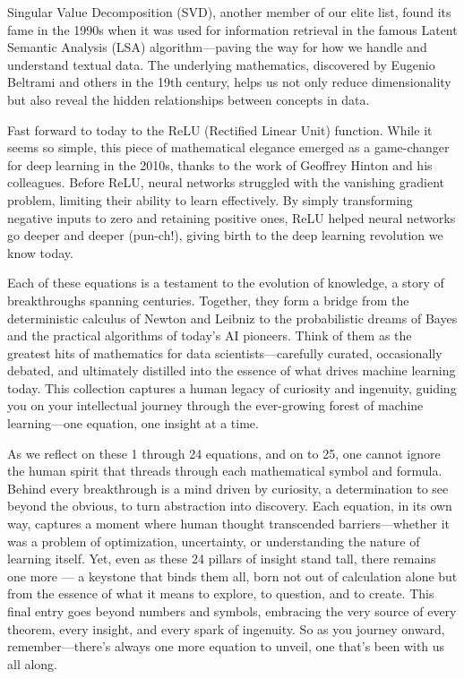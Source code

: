 \documentclass[
  12 pt,
  a4paper,
]{book}
\numberwithin{equation}{section}
\theoremstyle{plain}      %
\theoremstyle{definition} %
\theoremstyle{remark}     %
\theoremstyle{note}         %
\begin{document}
Singular Value Decomposition (SVD), another member of our elite list,
found its fame in the 1990s when it was used for information retrieval
in the famous Latent Semantic Analysis (LSA) algorithm---paving the way
for how we handle and understand textual data. The underlying
mathematics, discovered by Eugenio Beltrami and others in the 19th
century, helps us not only reduce dimensionality but also reveal the
hidden relationships between concepts in data.

Fast forward to today to the ReLU (Rectified Linear Unit) function.
While it seems so simple, this piece of mathematical elegance emerged as
a game-changer for deep learning in the 2010s, thanks to the work of
Geoffrey Hinton and his colleagues. Before ReLU, neural networks
struggled with the vanishing gradient problem, limiting their ability to
learn effectively. By simply transforming negative inputs to zero and
retaining positive ones, ReLU helped neural networks go deeper and
deeper (pun-ch!), giving birth to the deep learning revolution we know
today.

Each of these equations is a testament to the evolution of knowledge, a
story of breakthroughs spanning centuries. Together, they form a bridge
from the deterministic calculus of Newton and Leibniz to the
probabilistic dreams of Bayes and the practical algorithms of today's AI
pioneers. Think of them as the greatest hits of mathematics for data
scientists---carefully curated, occasionally debated, and ultimately
distilled into the essence of what drives machine learning today. This
collection captures a human legacy of curiosity and ingenuity, guiding
you on your intellectual journey through the ever-growing forest of
machine learning---one equation, one insight at a time.

As we reflect on these 1 through 24 equations, and on to 25, one cannot
ignore the human spirit that threads through each mathematical symbol
and formula. Behind every breakthrough is a mind driven by curiosity, a
determination to see beyond the obvious, to turn abstraction into
discovery. Each equation, in its own way, captures a moment where human
thought transcended barriers---whether it was a problem of optimization,
uncertainty, or understanding the nature of learning itself. Yet, even
as these 24 pillars of insight stand tall, there remains one more --- a
keystone that binds them all, born not out of calculation alone but from
the essence of what it means to explore, to question, and to create.
This final entry goes beyond numbers and symbols, embracing the very
source of every theorem, every insight, and every spark of ingenuity. So
as you journey onward, remember---there's always one more equation to
unveil, one that's been with us all along.
\end{document}
